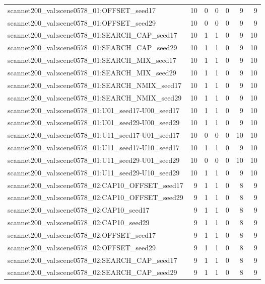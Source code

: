 \begin{table}[t]
\begin{tabular}{lrrrrrr}
scannet200\_val:scene0578\_01:OFFSET\_seed17 & 10 & 0 & 0 & 0 & 9 & 9 \\
scannet200\_val:scene0578\_01:OFFSET\_seed29 & 10 & 0 & 0 & 0 & 9 & 9 \\
scannet200\_val:scene0578\_01:SEARCH\_CAP\_seed17 & 10 & 1 & 1 & 0 & 9 & 10 \\
scannet200\_val:scene0578\_01:SEARCH\_CAP\_seed29 & 10 & 1 & 1 & 0 & 9 & 10 \\
scannet200\_val:scene0578\_01:SEARCH\_MIX\_seed17 & 10 & 1 & 1 & 0 & 9 & 10 \\
scannet200\_val:scene0578\_01:SEARCH\_MIX\_seed29 & 10 & 1 & 1 & 0 & 9 & 10 \\
scannet200\_val:scene0578\_01:SEARCH\_NMIX\_seed17 & 10 & 1 & 1 & 0 & 9 & 10 \\
scannet200\_val:scene0578\_01:SEARCH\_NMIX\_seed29 & 10 & 1 & 1 & 0 & 9 & 10 \\
scannet200\_val:scene0578\_01:U01\_seed17-U00\_seed17 & 10 & 1 & 1 & 0 & 9 & 10 \\
scannet200\_val:scene0578\_01:U01\_seed29-U00\_seed29 & 10 & 1 & 1 & 0 & 9 & 10 \\
scannet200\_val:scene0578\_01:U11\_seed17-U01\_seed17 & 10 & 0 & 0 & 0 & 10 & 10 \\
scannet200\_val:scene0578\_01:U11\_seed17-U10\_seed17 & 10 & 1 & 1 & 0 & 9 & 10 \\
scannet200\_val:scene0578\_01:U11\_seed29-U01\_seed29 & 10 & 0 & 0 & 0 & 10 & 10 \\
scannet200\_val:scene0578\_01:U11\_seed29-U10\_seed29 & 10 & 1 & 1 & 0 & 9 & 10 \\
scannet200\_val:scene0578\_02:CAP10\_OFFSET\_seed17 & 9 & 1 & 1 & 0 & 8 & 9 \\
scannet200\_val:scene0578\_02:CAP10\_OFFSET\_seed29 & 9 & 1 & 1 & 0 & 8 & 9 \\
scannet200\_val:scene0578\_02:CAP10\_seed17 & 9 & 1 & 1 & 0 & 8 & 9 \\
scannet200\_val:scene0578\_02:CAP10\_seed29 & 9 & 1 & 1 & 0 & 8 & 9 \\
scannet200\_val:scene0578\_02:OFFSET\_seed17 & 9 & 1 & 1 & 0 & 8 & 9 \\
scannet200\_val:scene0578\_02:OFFSET\_seed29 & 9 & 1 & 1 & 0 & 8 & 9 \\
scannet200\_val:scene0578\_02:SEARCH\_CAP\_seed17 & 9 & 1 & 1 & 0 & 8 & 9 \\
scannet200\_val:scene0578\_02:SEARCH\_CAP\_seed29 & 9 & 1 & 1 & 0 & 8 & 9 \\

\end{tabular}
\end{table}
